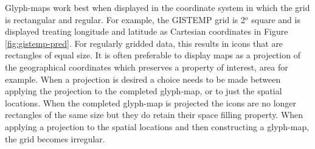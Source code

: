 \documentclass[oneside]{article}
\begin{document}
Glyph-maps work best when displayed in the coordinate system in which the grid is rectangular and regular.  For example, the GISTEMP grid is 2$^o$ square and is displayed treating longitude and latitude as Cartesian coordinates in Figure \ref{fig:gistemp-pred}.  For regularly gridded data, this results in icons that are rectangles of equal size.  It is often preferable to display maps as a projection of the geographical coordinates which preserves a property of interest, area for example. When a projection is desired a choice needs to be made between applying the projection to the completed glyph-map, or to just the spatial locations.  When the completed glyph-map is projected the icons are no longer rectangles of the same size but they do retain their space filling property.  When applying a projection to the spatial locations and then constructing a glyph-map, the grid becomes irregular. 
\end{document}
